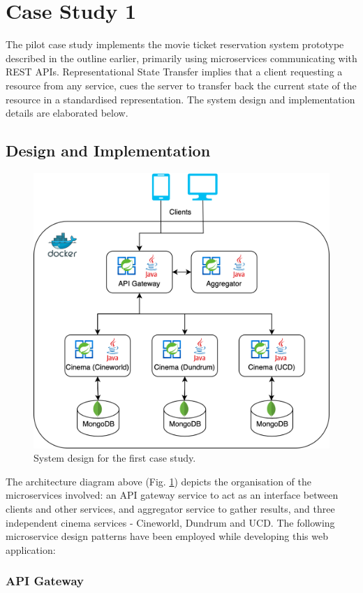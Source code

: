 \section{Case Study 1}

The pilot case study implements the movie ticket reservation system prototype described in the outline earlier, primarily using microservices communicating with REST APIs. Representational State Transfer implies that a client requesting a resource from any service, cues the server to transfer back the current state of the resource in a standardised representation. The system design and implementation details are elaborated below.

\subsection{Design and Implementation}

\begin{figure}[H]
  \centering
  \includegraphics[width=0.6\linewidth]{./assets/diagrams/cs01-arch.png}
  \caption{System design for the first case study.}
  \label{fig:cs01-arch}
\end{figure}

The architecture diagram above (Fig. \ref{fig:cs01-arch}) depicts the organisation of the microservices involved: an API gateway service to act as an interface between clients and other services, and aggregator service to gather results, and three independent cinema services - Cineworld, Dundrum and UCD. The following microservice design patterns have been employed while developing this web application:

\subsubsection{API Gateway}

